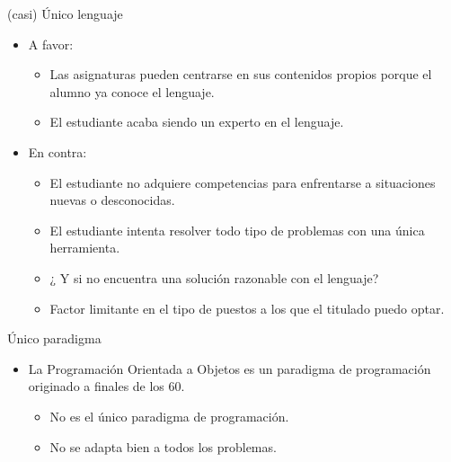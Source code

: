 \begin{frame}[t]{(casi) Único lenguaje}
  \begin{itemize}
    \item A favor:
      \begin{itemize}
        \item Las asignaturas pueden centrarse en sus contenidos propios porque el alumno ya conoce el lenguaje.
        \item El estudiante acaba siendo un experto en el lenguaje.
      \end{itemize}
    \item En contra:
      \begin{itemize}
        \item El estudiante no adquiere competencias para enfrentarse a situaciones nuevas o desconocidas.
        \item El estudiante intenta resolver todo tipo de problemas con una única herramienta.
        \item ¿ Y si no encuentra una solución razonable con el lenguaje?
        \item Factor limitante en el tipo de puestos a los que el titulado puedo optar.
      \end{itemize}
  \end{itemize}
\end{frame}

\begin{frame}[t]{Único paradigma}
  \begin{itemize}
    \item La Programación Orientada a Objetos es un paradigma de programación originado a finales de los 60.
      \begin{itemize}
        \item No es el único paradigma de programación.
        \item No se adapta bien a todos los problemas.
      \end{itemize}
  \end{itemize}
\end{frame}
